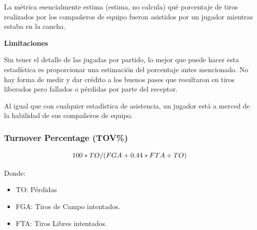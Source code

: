 \documentclass[
]{article}
\newenvironment{Shaded}{\begin{snugshade}}{\end{snugshade}}
\newcommand{\DecValTok}[1]{\textcolor[rgb]{0.00,0.00,0.81}{#1}}
\newcommand{\NormalTok}[1]{#1}
\newcommand{\OperatorTok}[1]{\textcolor[rgb]{0.81,0.36,0.00}{\textbf{#1}}}
\newcommand{\StringTok}[1]{\textcolor[rgb]{0.31,0.60,0.02}{#1}}
\providecommand{\tightlist}{%
  \setlength{\itemsep}{0pt}\setlength{\parskip}{0pt}}
\begin{document}
La métrica esencialmente estima (estima, no calcula) qué porcentaje de
tiros realizados por los compañeros de equipo fueron asistidos por un
jugador mientras estaba en la cancha.

\textbf{Limitaciones}

Sin tener el detalle de las jugadas por partido, lo mejor que puede
hacer esta estadística es proporcionar una estimación del porcentaje
antes mencionado. No hay forma de medir y dar crédito a los buenos pases
que resultaron en tiros liberados pero fallados o pérdidas por parte del
receptor.

Al igual que con cualquier estadística de asistencia, un jugador está a
merced de la habilidad de sus compañeros de equipo.

\begin{Shaded}
\end{Shaded}

\hypertarget{turnover-percentage-tov}{%
\subsubsection{Turnover Percentage
(TOV\%)}\label{turnover-percentage-tov}}

\[
  \makebox[\linewidth]{$100*TO/(FGA+0.44*FTA+TO)$}
\]

Donde:

\begin{itemize}
\tightlist
\item
  TO: Pérdidas
\item
  FGA: Tiros de Campo intentados.
\item
  FTA: Tiros Libres intentados.
\end{itemize}
\end{document}

